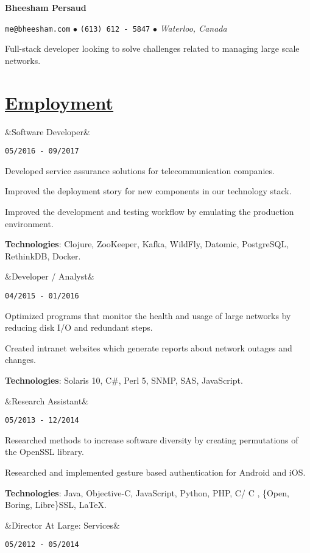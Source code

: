 \documentclass[11pt]{article} %
\newcommand{\heading}[1]{
    \section*{\uline{\hfill #1 }} %
}
\newcommand{\squish}{
\setlength{\itemsep}{0.2pt}
    \setlength{\parskip}{0pt} %
    \setlength{\parsep}{0.2pt}
}
\newcommand{\when}[1]{ %
    \hfill \texttt{#1}
}
\newcommand{\experience}[3]{ %
    \ifx&#2&
\item[{#1}]
    \else
\item[{#1}, \emph{#2}]
    \fi
    \when{#3}
}
\newcommand{\contact}[3]{
    \centerline{ \large \texttt{#1} $\bullet$ \texttt{#2} $\bullet$ \emph{#3} }
    \vspace{0.1in}
}
\newcommand{\technologies}[1]{
    {\small \textbf{Technologies}: #1.}
}
\newcommand{\CPP}{
    C\hspace{-.05em}\raisebox{.4ex}{\tiny\bf +}\hspace{-.10em}\raisebox{.4ex}{\tiny\bf +}
}
\begin{document}
\centerline{{\huge \bf Bheesham Persaud}}
\bigskip

\contact{me@bheesham.com}
        {(613) 612 - 5847}
        {Waterloo, Canada}

Full-stack developer looking to solve challenges related to managing large
scale networks.

\heading{Employment}%

\begin{description}
        \squish

        \experience{CENX}
                   {Software Developer}
                   {05/2016 - 09/2017}

        Developed service assurance solutions for telecommunication companies.

        Improved the deployment story for new components in our technology
        stack.

        Improved the development and testing workflow by emulating the
        production environment.

        \technologies{Clojure, ZooKeeper, Kafka, WildFly, Datomic, PostgreSQL,
        RethinkDB, Docker}

        \experience{Shared Services Canada}
                   {Developer / Analyst}
                   {04/2015 - 01/2016}

           Optimized programs that monitor the health and usage of large
           networks by reducing disk I/O and redundant steps.
           
           Created intranet websites which generate reports about network
           outages and changes.
           
           \technologies{Solaris 10, C\#, Perl 5, SNMP, SAS, JavaScript}

        \experience{Carleton University}
                   {Research Assistant}
                   {05/2013 - 12/2014}

            Researched methods to increase software diversity by creating
            permutations of the OpenSSL library.

            Researched and implemented gesture based authentication for Android
            and iOS.
            
            \technologies{Java, Objective-C, JavaScript, Python, PHP, C/\CPP,
            \{Open, Boring, Libre\}SSL, \LaTeX}

        \experience{Carleton Computer Science Society}
                   {Director At Large: Services}
                   {05/2012 - 05/2014}


\end{description}
\end{document}
